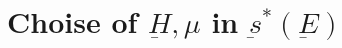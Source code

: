 \documentclass[11pt]{article}
\theoremstyle{boldStyle}
\begin{document}
\newpage
\section{Choise of $\underbar{H}, \mu$ in $\underbar{s}^*(\underbar{E})$}






\end{document}
